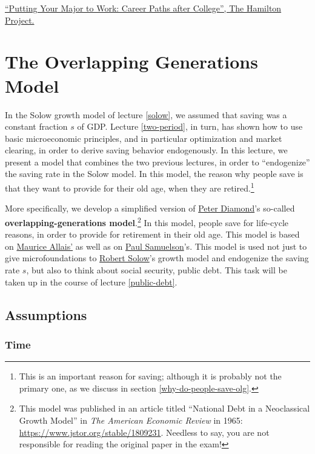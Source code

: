 \documentclass[]{book}
\let\rmarkdownfootnote\footnote%
\def\footnote{\protect\rmarkdownfootnote}
\theoremstyle{definition}
\theoremstyle{definition}
\theoremstyle{definition}
\theoremstyle{remark}
\begin{document}
\href{http://www.hamiltonproject.org/charts/median_earnings_for_largest_occupations}{``Putting
Your Major to Work: Career Paths after College'', The Hamilton Project.}

\hypertarget{olg}{\chapter{The Overlapping Generations
Model}\label{olg}}

In the Solow growth model of lecture \ref{solow}, we assumed that saving
was a constant fraction \(s\) of GDP. Lecture \ref{two-period}, in turn,
has shown how to use basic microeconomic principles, and in particular
optimization and market clearing, in order to derive saving behavior
endogenously. In this lecture, we present a model that combines the two
previous lectures, in order to ``endogenize'' the saving rate in the
Solow model. In this model, the reason why people save is that they want
to provide for their old age, when they are retired.\footnote{This is an
  important reason for saving; although it is probably not the primary
  one, as we discuss in section \ref{why-do-people-save-olg}.}

More specifically, we develop a simplified version of
\href{https://en.wikipedia.org/wiki/Peter_Diamond}{Peter Diamond}'s
so-called \textbf{overlapping-generations model}.\footnote{This model
  was published in an article titled ``National Debt in a Neoclassical
  Growth Model'' in \emph{The American Economic Review} in 1965:
  \url{https://www.jstor.org/stable/1809231}. Needless to say, you are
  not responsible for reading the original paper in the exam!} In this
model, people save for life-cycle reasons, in order to provide for
retirement in their old age. This model is based on
\href{https://en.wikipedia.org/wiki/Maurice_Allais}{Maurice Allais'} as
well as on \href{https://en.wikipedia.org/wiki/Paul_Samuelson}{Paul
Samuelson}'s. This model is used not just to give microfoundations to
\href{https://en.wikipedia.org/wiki/Robert_Solow}{Robert Solow}'s growth
model and endogenize the saving rate \(s\), but also to think about
social security, public debt. This task will be taken up in the course
of lecture \ref{public-debt}.

\section{Assumptions}\label{assumptions-1}

\subsection{Time}\label{time}
\end{document}
